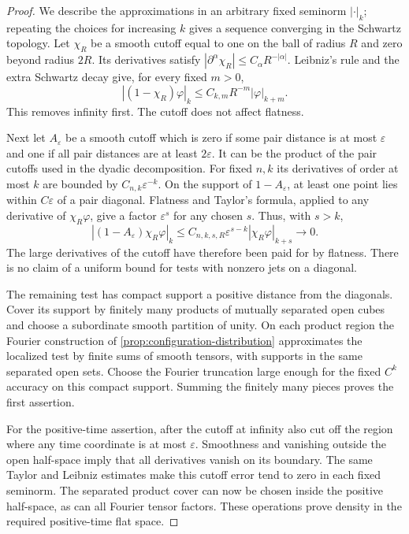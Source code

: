 \documentclass[11pt,letterpaper,reqno]{amsart}
\theoremstyle{definition}
\theoremstyle{remark}
\begin{document}
\begin{proof}
We describe the approximations in an arbitrary fixed seminorm
$|\cdot|_k$; repeating the choices for increasing $k$ gives a
sequence converging in the Schwartz topology. Let $\chi_R$ be a
smooth cutoff equal to one on the ball of radius $R$ and zero beyond
radius $2R$. Its derivatives satisfy
$|\partial^\alpha\chi_R|\le C_\alpha R^{-|\alpha|}$.
Leibniz's rule and the extra Schwartz decay give, for every fixed
$m>0$,
\[
 |(1-\chi_R)\varphi|_k\le C_{k,m}R^{-m}|\varphi|_{k+m}.
\]
This removes infinity first. The cutoff does not affect flatness.

Next let $A_\varepsilon$ be a smooth cutoff which is zero if some
pair distance is at most $\varepsilon$ and one if all pair distances
are at least $2\varepsilon$. It can be the product of the pair
cutoffs used in the dyadic decomposition. For fixed $n,k$ its
derivatives of order at most $k$ are bounded by
$C_{n,k}\varepsilon^{-k}$. On the support of
$1-A_\varepsilon$, at least one point lies within
$C\varepsilon$ of a pair diagonal. Flatness and Taylor's formula,
applied to any derivative of $\chi_R\varphi$, give a factor
$\varepsilon^s$ for any chosen $s$. Thus, with $s>k$,
\[
 |(1-A_\varepsilon)\chi_R\varphi|_k
             \le C_{n,k,s,R}\varepsilon^{s-k}
                                      |\chi_R\varphi|_{k+s}
             \longrightarrow0.
\]
The large derivatives of the cutoff have therefore been paid for by
flatness. There is no claim of a uniform bound for tests with nonzero
jets on a diagonal.

The remaining test has compact support a positive distance from the
diagonals. Cover its support by finitely many products of mutually
separated open cubes and choose a subordinate smooth partition of
unity. On each product region the Fourier construction of
\cref{prop:configuration-distribution} approximates the localized test
by finite sums of smooth tensors, with supports in the same separated
open sets. Choose the Fourier truncation large enough for the fixed
$C^k$ accuracy on this compact support. Summing the finitely many
pieces proves the first assertion.

For the positive-time assertion, after the cutoff at infinity also
cut off the region where any time coordinate is at most
$\varepsilon$. Smoothness and vanishing outside the open half-space
imply that all derivatives vanish on its boundary. The same Taylor
and Leibniz estimates make this cutoff error tend to zero in each
fixed seminorm. The separated product cover can now be chosen inside
the positive half-space, as can all Fourier tensor factors. These
operations prove density in the required positive-time flat space.
\end{proof}
\end{document}

